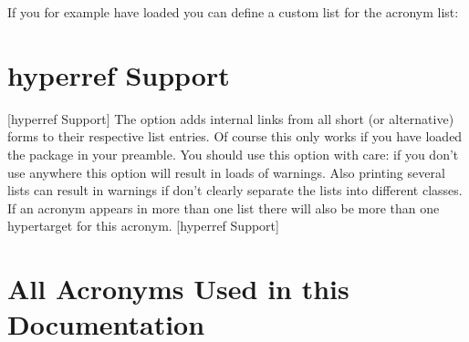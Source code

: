 \documentclass[DIV10,toc=index,toc=bib,hyperfootnotes=false]{cnpkgdoc}
\begin{document}
If you for example have loaded  you can define a custom list for
the acronym list:
\begin{beispiel}
 \newcommand*\addcolon[1]{#1:}
 \printacronyms
\end{beispiel}

\section{hyperref Support}[hyperref Support]
The option  adds internal links from all short (or alternative)
forms to their respective list entries. Of course this only works if you have
loaded the  package in your preamble. You should use this option
with care: if you don't use  anywhere this option will result
in loads of  warnings. Also printing several lists can result in
warnings if don't clearly separate the lists into different classes. If an acronym
appears in more than one list there will also be more than one hypertarget for this
acronym.
[hyperref Support]

\appendix

\section{All Acronyms Used in this Documentation}\label{sec:documentation_acronyms}
\begin{beispiel}
 \printacronyms
\end{beispiel}
\printacronyms

\begin{beispiel}
\end{beispiel}

{\RaggedRight\EmbracOff
\printbibliography}

\printindex
\end{document}
